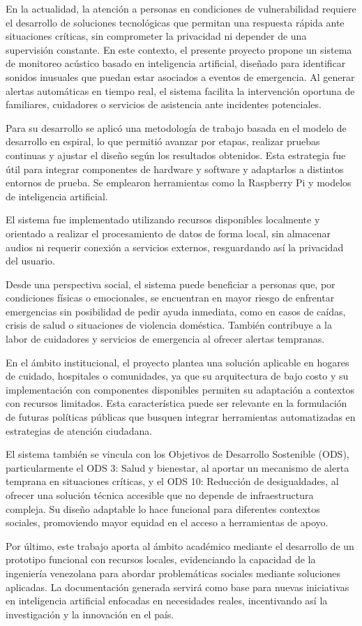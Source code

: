 
En la actualidad, la atención a personas en condiciones de vulnerabilidad requiere el desarrollo de soluciones tecnológicas que permitan una respuesta rápida ante situaciones críticas, sin comprometer la privacidad ni depender de una supervisión constante. En este contexto, el presente proyecto propone un sistema de monitoreo acústico basado en inteligencia artificial, diseñado para identificar sonidos inusuales que puedan estar asociados a eventos de emergencia. Al generar alertas automáticas en tiempo real, el sistema facilita la intervención oportuna de familiares, cuidadores o servicios de asistencia ante incidentes potenciales.

Para su desarrollo se aplicó una metodología de trabajo basada en el modelo de desarrollo en espiral, lo que permitió avanzar por etapas, realizar pruebas continuas y ajustar el diseño según los resultados obtenidos. Esta estrategia fue útil para integrar componentes de hardware y software y adaptarlos a distintos entornos de prueba. Se emplearon herramientas como la Raspberry Pi y modelos de inteligencia artificial.

El sistema fue implementado utilizando recursos disponibles localmente y orientado a realizar el procesamiento de datos de forma local, sin almacenar audios ni requerir conexión a servicios externos, resguardando así la privacidad del usuario.

Desde una perspectiva social, el sistema puede beneficiar a personas que, por condiciones físicas o emocionales, se encuentran en mayor riesgo de enfrentar emergencias sin posibilidad de pedir ayuda inmediata, como en casos de caídas, crisis de salud o situaciones de violencia doméstica. También contribuye a la labor de cuidadores y servicios de emergencia al ofrecer alertas tempranas.

En el ámbito institucional, el proyecto plantea una solución aplicable en hogares de cuidado, hospitales o comunidades, ya que su arquitectura de bajo costo y su implementación con componentes disponibles permiten su adaptación a contextos con recursos limitados. Esta característica puede ser relevante en la formulación de futuras políticas públicas que busquen integrar herramientas automatizadas en estrategias de atención ciudadana.

El sistema también se vincula con los Objetivos de Desarrollo Sostenible (ODS), particularmente el ODS 3: Salud y bienestar, al aportar un mecanismo de alerta temprana en situaciones críticas, y el ODS 10: Reducción de desigualdades, al ofrecer una solución técnica accesible que no depende de infraestructura compleja. Su diseño adaptable lo hace funcional para diferentes contextos sociales, promoviendo mayor equidad en el acceso a herramientas de apoyo.

Por último, este trabajo aporta al ámbito académico mediante el desarrollo de un prototipo funcional con recursos locales, evidenciando la capacidad de la ingeniería venezolana para abordar problemáticas sociales mediante soluciones aplicadas. La documentación generada servirá como base para nuevas iniciativas en inteligencia artificial enfocadas en necesidades reales, incentivando así la investigación y la innovación en el país.
